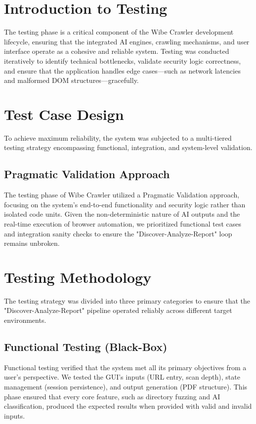 \documentclass[12pt,oneside,a4paper]{book}
\begin{document}
\section{Introduction to Testing}

The testing phase is a critical component of the Wibe Crawler development lifecycle, ensuring that the integrated AI engines, crawling mechanisms, and user interface operate as a cohesive and reliable system. Testing was conducted iteratively to identify technical bottlenecks, validate security logic correctness, and ensure that the application handles edge cases—such as network latencies and malformed DOM structures—gracefully.

\section{Test Case Design}

To achieve maximum reliability, the system was subjected to a multi-tiered testing strategy encompassing functional, integration, and system-level validation.

\subsection{Pragmatic Validation Approach}
The testing phase of Wibe Crawler utilized a Pragmatic Validation approach, focusing on the system's end-to-end functionality and security logic rather than isolated code units. Given the non-deterministic nature of AI outputs and the real-time execution of browser automation, we prioritized functional test cases and integration sanity checks to ensure the "Discover-Analyze-Report" loop remains unbroken.

\section{Testing Methodology}

The testing strategy was divided into three primary categories to ensure that the "Discover-Analyze-Report" pipeline operated reliably across different target environments.

\subsection{Functional Testing (Black-Box)}
Functional testing verified that the system met all its primary objectives from a user's perspective. We tested the GUI's inputs (URL entry, scan depth), state management (session persistence), and output generation (PDF structure). This phase ensured that every core feature, such as directory fuzzing and AI classification, produced the expected results when provided with valid and invalid inputs.
\end{document}
